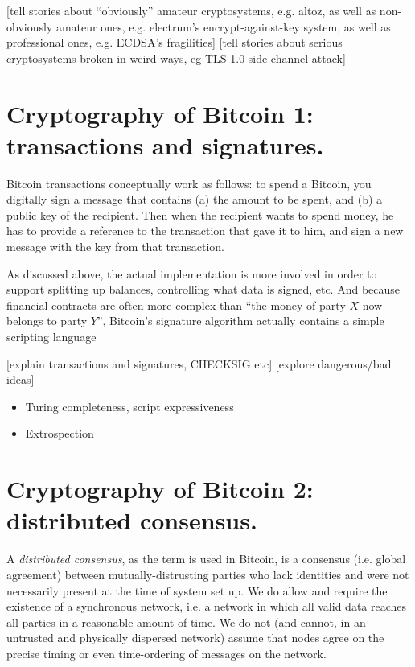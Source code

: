 \documentclass[letterpaper]{article}
\begin{document}
[tell stories about ``obviously'' amateur cryptosystems, e.g. altoz, as well
as non-obviously amateur ones, e.g. electrum's encrypt-against-key system,
as well as professional ones, e.g. ECDSA's fragilities]
[tell stories about serious cryptosystems broken in weird ways, eg TLS 1.0 side-channel attack]

\section{Cryptography of Bitcoin 1: transactions and signatures. \label{txes}}

Bitcoin transactions conceptually work as follows: to spend a Bitcoin, you
digitally sign a message that contains (a) the amount to be spent, and (b)
a public key of the recipient. Then when the recipient wants to spend money,
he has to provide a reference to the transaction that gave it to him, and
sign a new message with the key from that transaction.

As discussed above, the actual implementation is more involved in order to
support splitting up balances, controlling what data is signed, etc. And
because financial contracts are often more complex than ``the money of
party $X$ now belongs to party $Y$'', Bitcoin's signature algorithm actually
contains a simple scripting language

[explain transactions and signatures, CHECKSIG etc]
[explore dangerous/bad ideas]
\begin{itemize}
\item Turing completeness, script expressiveness
\item Extrospection
\end{itemize}

\section{Cryptography of Bitcoin 2: distributed consensus.\label{consensus}}

A \emph{distributed consensus}, as the term is used in Bitcoin, is a consensus (i.e.
global agreement) between mutually-distrusting parties who lack identities and were
not necessarily present at the time of system set up. We do allow and require the
existence of a synchronous network, i.e. a network in which all valid data reaches
all parties in a reasonable amount of time. We do not (and cannot, in an untrusted
and physically dispersed network) assume that nodes agree on the precise timing or
even time-ordering of messages on the network.
\end{document}
